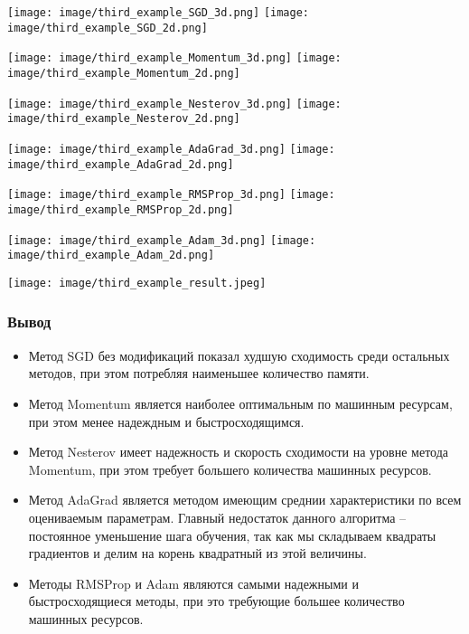 \documentclass{article}
\begin{document}
\begin{center}
    \texttt{[image: image/third\_example\_SGD\_3d.png]}
    \texttt{[image: image/third\_example\_SGD\_2d.png]}
    \label{fig:enter-label}
\end{center}
\begin{center}
    \texttt{[image: image/third\_example\_Momentum\_3d.png]}
    \texttt{[image: image/third\_example\_Momentum\_2d.png]}
    \label{fig:enter-label}
\end{center}
\begin{center}
    \texttt{[image: image/third\_example\_Nesterov\_3d.png]}
    \texttt{[image: image/third\_example\_Nesterov\_2d.png]}
    \label{fig:enter-label}
\end{center}
\begin{center}
    \texttt{[image: image/third\_example\_AdaGrad\_3d.png]}
    \texttt{[image: image/third\_example\_AdaGrad\_2d.png]}
    \label{fig:enter-label}
\end{center}
\begin{center}
    \texttt{[image: image/third\_example\_RMSProp\_3d.png]}
    \texttt{[image: image/third\_example\_RMSProp\_2d.png]}
    \label{fig:enter-label}
\end{center}
\begin{center}
    \texttt{[image: image/third\_example\_Adam\_3d.png]}
    \texttt{[image: image/third\_example\_Adam\_2d.png]}
    \label{fig:enter-label}
\end{center}
\texttt{[image: image/third\_example\_result.jpeg]}
\subsubsection*{Вывод}
\begin{itemize}
    \item Метод SGD без модификаций показал худшую сходимость среди остальных методов, при этом потребляя наименьшее количество памяти.
    \item Метод Momentum является наиболее оптимальным по машинным ресурсам, при этом менее надеждным и быстросходящимся.
    \item Метод Nesterov имеет надежность и скорость сходимости на уровне метода Momentum, при этом требует большего количества машинных ресурсов.
    \item Метод AdaGrad является методом имеющим среднии характеристики по всем оцениваемым параметрам. Главный недостаток данного алгоритма – постоянное уменьшение шага обучения, так как мы складываем квадраты градиентов и делим на корень квадратный из этой величины.
    \item Методы RMSProp и Adam являются самыми надежными и быстросходящиеся методы, при это требующие большее количество машинных ресурсов.
\end{itemize}
\end{document}
